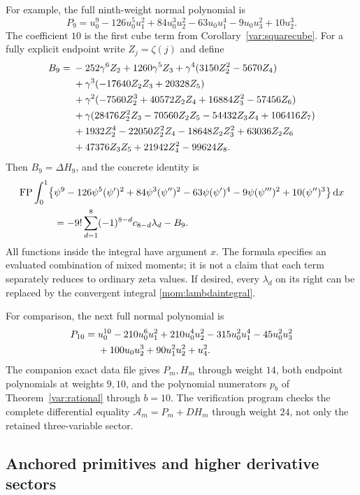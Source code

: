 \documentclass[11pt,letterpaper]{article}
\numberwithin{equation}{section}
\theoremstyle{plain}
\theoremstyle{definition}
\theoremstyle{remark}
\newcommand{\dd}{\,\mathrm d}\newcommand{\iu}{\mathrm i}
\newcommand{\Acal}{\mathcal A}\newcommand{\cA}{\mathcal A}
\begin{document}
For example, the full ninth-weight normal polynomial is
\begin{equation}\label{mom:P9}
 P_9=u_0^9-126u_0^5u_1^2+84u_0^3u_2^2
       -63u_0u_1^4-9u_0u_3^2+10u_2^3.
\end{equation}
The coefficient $10$ is the first cube term from
Corollary~\ref{var:squarecube}. For a fully explicit endpoint write
$Z_j=\zeta(j)$ and define
\begin{align}\label{mom:B9}
 B_9={}&-252\gamma^6Z_2+1260\gamma^5Z_3
          +\gamma^4(3150Z_2^2-5670Z_4)\notag\\
 &+\gamma^3(-17640Z_2Z_3+20328Z_5)\notag\\
 &+\gamma^2(-7560Z_2^3+40572Z_2Z_4+16884Z_3^2-57456Z_6)\notag\\
 &+\gamma(28476Z_2^2Z_3-70560Z_2Z_5-54432Z_3Z_4+106416Z_7)\notag\\
 &+1932Z_2^4-22050Z_2^2Z_4-18648Z_2Z_3^2+63036Z_2Z_6\notag\\
 &+47376Z_3Z_5+21942Z_4^2-99624Z_8.
\end{align}
Then $B_9=\Delta H_9$, and the concrete identity is
\begin{align}\label{mom:ninthidentity}
 \FP\int_0^1\bigl\{&\psi^9-126\psi^5(\psi')^2
   +84\psi^3(\psi'')^2-63\psi(\psi')^4
   -9\psi(\psi''')^2+10(\psi'')^3\bigr\}\dd x\notag\\
 &=-9!\sum_{d=1}^8(-1)^{8-d}c_{8-d}\lambda_d-B_9.
\end{align}
All functions inside the integral have argument $x$.
The formula specifies an evaluated combination of mixed moments;
it is not a claim that each term separately reduces to ordinary zeta
values. If desired, every $\lambda_d$ on its right can be replaced
by the convergent integral \eqref{mom:lambdaintegral}.

For comparison, the next full normal polynomial is
\begin{align}\label{mom:P10}
 P_{10}={}&u_0^{10}-210u_0^6u_1^2+210u_0^4u_2^2
       -315u_0^2u_1^4-45u_0^2u_3^2\notag\\
       &+100u_0u_2^3+90u_1^2u_2^2+u_4^2.
\end{align}
The companion exact data file gives $P_m,H_m$ through weight $14$,
both endpoint polynomials at weights $9,10$, and the polynomial
numerators $p_b$ of Theorem~\ref{var:rational} through $b=10$.
The verification program checks the complete differential equality
$\Acal_m=P_m+DH_m$ through weight $24$, not only the retained
three-variable sector.

\subsection{Anchored primitives and higher derivative sectors}
\end{document}
